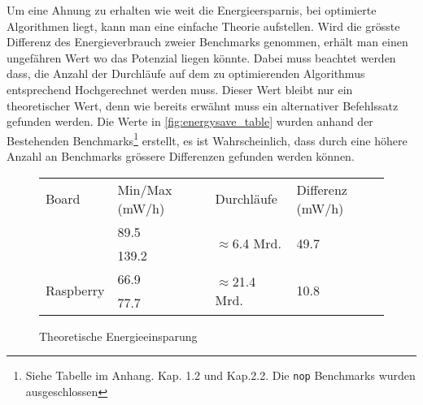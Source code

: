 \par
Um eine Ahnung zu erhalten wie weit die Energieersparnis, bei optimierte Algorithmen liegt, kann man eine einfache Theorie aufstellen. Wird die grösste Differenz des Energieverbrauch zweier Benchmarks genommen, erhält man einen ungefähren Wert wo das Potenzial liegen könnte. Dabei muss beachtet werden dass, die Anzahl der Durchläufe auf dem zu optimierenden Algorithmus entsprechend Hochgerechnet werden muss. Dieser Wert bleibt nur ein theoretischer Wert, denn wie bereits erwähnt muss ein alternativer Befehlssatz gefunden werden. Die Werte in \autoref{fig:energysave_table} wurden anhand der Bestehenden Benchmarks\footnote{Siehe Tabelle im Anhang. Kap. 1.2 und Kap.2.2. Die \texttt{nop} Benchmarks wurden ausgeschlossen} erstellt, es ist Wahrscheinlich, dass durch eine höhere Anzahl an Benchmarks grössere Differenzen gefunden werden können.


\begin{figure}[H]
\center
\begin{tabular}{ |l|l|l|l| }
\hline
Board & Min/Max (mW/h) & Durchläufe & Differenz (mW/h) \\ \hhline{|=|=|=|=|}
\multirow{2}{*}{Galileo} & 89.5 & \multirow{2}{*}{$\approx$6.4 Mrd.} & \multirow{2}{*}{49.7} \\ 
 & 139.2 & &  \\ \hline
\multirow{2}{*}{Raspberry} & 66.9 & \multirow{2}{*}{$\approx$21.4 Mrd.} & \multirow{2}{*}{10.8} \\ 
 & 77.7 & &  \\
\hline
\end{tabular}
\caption{Theoretische Energieeinsparung}
\label{fig:energysave_table}
\end{figure}

